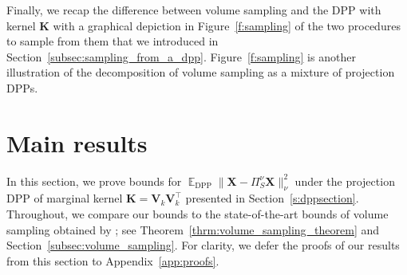 \documentclass[twoside,11pt]{book}
\newtheorem{proposition}{Proposition}
\numberwithin{theorem}{chapter}
\numberwithin{definition}{chapter}
\numberwithin{proposition}{chapter}
\numberwithin{corollary}{chapter}
\numberwithin{example}{chapter}
\numberwithin{lemma}{chapter}
\numberwithin{assumption}{chapter}
\DeclareMathOperator{\Det}{Det}
\DeclareMathOperator{\Fr}{\mathrm{Fr}}
\DeclareMathOperator{\DPP}{\mathrm{DPP}}
\DeclareMathOperator{\VS}{\mathrm{VS}}
\DeclareMathOperator{\Tran}{\intercal}
\DeclareMathOperator{\EX}{\mathbb{E}}
\DeclareMathOperator{\Prb}{\mathbb{P}}
\begin{document}
Finally, we recap the difference between volume sampling and the DPP with kernel $\bm K$ with a graphical depiction in Figure~\ref{f:sampling} of the two procedures to sample from them that we introduced in Section~\ref{subsec:sampling_from_a_dpp}. Figure~\ref{f:sampling} is another illustration of the decomposition of volume sampling as a mixture of projection DPPs.


\section{Main results}
In this section, we prove bounds for $\EX_{\DPP} \| \bm{X} - \Pi_{S}^{\nu}\bm{X} \|^2_{\nu}$ under the projection DPP of marginal kernel $\bm{K} = \bm{V}^{}_{k}\bm{V}^{\Tran}_{k}$ presented in Section~\ref{s:dppsection}. Throughout, we compare our bounds to the state-of-the-art bounds of volume sampling obtained by \cite{DRVW06}; see Theorem~\ref{thrm:volume_sampling_theorem} and Section~\ref{subsec:volume_sampling}. For clarity, we defer the proofs of our results from this section to Appendix~\ref{app:proofs}.

%

\end{document}
